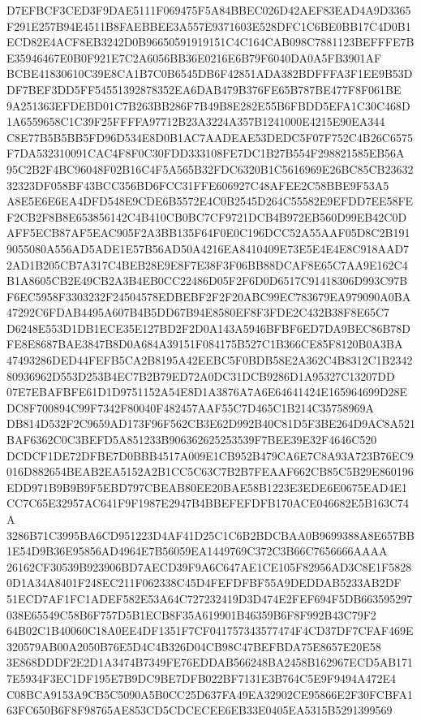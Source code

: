 \documentclass[UTF8,fontset=fandol,zihao=-4,a4paper]{ctexart}
\begin{document}
{{D7EFBCF3CED3F9DAE5111F069475F5A84BBEC026D42AEF83EAD4A9D3365F291E257B94E4511B8FAEBBEE3A557E9371603E528DFC1C6BE0BB17C4D0B1
ECD82E4ACF8EB3242D0B96650591919151C4C164CAB098C7881123BEFFFE7BE35946467E0B0F921E7C2A6056BB36E0216E6B79F6040DA0A5FB3901AF
BCBE41830610C39E8CA1B7C0B6545DB6F42851ADA382BDFFFA3F1EE9B53DDF7BEF3DD5FF54551392878352EA6DAB479B376FE65B787BE477F8F061BE
9A251363EFDEBD01C7B263BB286F7B49B8E282E55B6FBDD5EFA1C30C468D1A6559658C1C39F25FFFFA97712B23A3224A357B1241000E4215E90EA344
C8E77B5B5BB5FD96D534E8D0B1AC7AADEAE53DEDC5F07F752C4B26C6575F7DA532310091CAC4F8F0C30FDD333108FE7DC1B27B554F298821585EB56A
95C2B2F4BC96048F02B16C4F5A565B32FDC6320B1C5616969E26BC85CB2363232323DF058BF43BCC356BD6FCC31FFE606927C48AFEE2C58BBE9F53A5
A8E5E6E6EA4DFD548E9CDE6B5572E4C0B2545D264C55582E9EFDD7EE58FEF2CB2F8B8E653856142C4B410CB0BC7CF9721DCB4B972EB560D99EB42C0D
AFF5ECB87AF5EAC905F2A3BB135F64F0E0C196DCC52A55AAF05D8C2B1919055080A556AD5ADE1E57B56AD50A4216EA8410409E73E5E4E4E8C918AAD7
2AD1B205CB7A317C4BEB28E9E8F7E38F3F06BB88DCAF8E65C7AA9E162C4B1A8605CB2E49CB2A3B4EB0CC22486D05F2F6D0D6517C91418306D993C97B
F6EC5958F3303232F24504578EDBEBF2F2F20ABC99EC783679EA979090A0BA47292C6FDAB4495A607B4B5DD67B94E8580EF8F3FDE2C432B38F8E65C7
D6248E553D1DB1ECE35E127BD2F2D0A143A5946BFBF6ED7DA9BEC86B78DFE8E8687BAE3847B8D0A684A39151F084175B527C1B366CE85F8120B0A3BA
47493286DED44FEFB5CA2B8195A42EEBC5F0BDB58E2A362C4B8312C1B234280936962D553D253B4EC7B2B79ED72A0DC31DCB9286D1A95327C13207DD
07E7EBAFBFE61D1D9751152A54E8D1A3876A7A6E64641424E165964699D28EDC8F700894C99F7342F80040F482457AAF55C7D465C1B214C35758969A
DB814D532F2C9659AD173F96F562CB3E62D992B40C81D5F3BE264D9AC8A521BAF6362C0C3BEFD5A851233B906362625253539F7BEE39E32F4646C520
DCDCF1DE72DFBE7D0BBB4517A009E1CB952B479CA6E7C8A93A723B76EC9016D882654BEAB2EA5152A2B1CC5C63C7B2B7FEAAF662CB85C5B29E860196
EDD971B9B9B9F5EBD797CBEAB80EE20BAE58B1223E3EDE6E0675EAD4E1CC7C65E32957AC641F9F1987E2947B4BBEFEFDFB170ACE046682E5B163C74A
3286B71C3995BA6CD951223D4AF41D25C1C6B2BDCBAA0B9699388A8E657BB1E54D9B36E95856AD4964E7B56059EA1449769C372C3B66C7656666AAAA
26162CF30539B923906BD7AECD39F9A6C647AE1CE105F82956AD3C8E1F58280D1A34A8401F248EC211F062338C45D4FEFDFBF55A9DEDDAB5233AB2DF
51ECD7AF1FC1ADEF582E53A64C727232419D3D474E2FEF694F5DB663595297038E65549C58B6F757D5B1ECB8F35A619901B46359B6F8F992B43C79F2
64B02C1B40060C18A0EE4DF1351F7CF041757343577474F4CD37DF7CFAF469E320579AB00A2050B76E5D4C4B326D04CB98C47BEFBDA75E8657E20E58
3E868DDDF2E2D1A3474B7349FE76EDDAB566248BA2458B162967ECD5AB1717E5934F3EC1DF195E7B9DC9BE7DFB022BF7131E3B764C5E9F9494A472E4
C08BCA9153A9CB5C5090A5B0CC25D637FA49EA32902CE95866E2F30FCBFA163FC650B6F8F98765AE853CD5CDCECEE6EB33E0405EA5315B5291399569
}}
\end{document}

